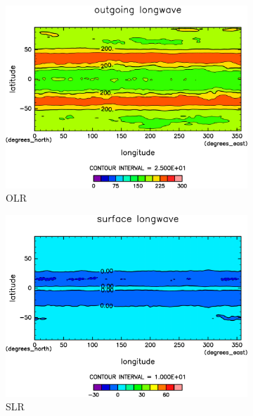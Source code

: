 \documentclass[body]{subfiles}
\begin{document}
\begin{figure}[t]
	\centering
	\begin{subfigure}{.4\textwidth}
		\centering
		\includegraphics[width=\textwidth]{S1800/OLR,time=3650:4015-crop-rotate.pdf}
		\caption{OLR \hmu*{[W/m^{-2}]}}\label{S1800OLR}
	\end{subfigure}
	\begin{subfigure}{.4\textwidth}
		\centering
		\includegraphics[width=\textwidth]{S1800/SLR,time=3650:4015-crop-rotate.pdf}
		\caption{SLR\hmu*{[W/m^{-2}]}}\label{S1800SLR}
	\end{subfigure}
	\begin{subfigure}{.4\textwidth}
		\centering

\end{subfigure}
\end{figure}
\end{document}
